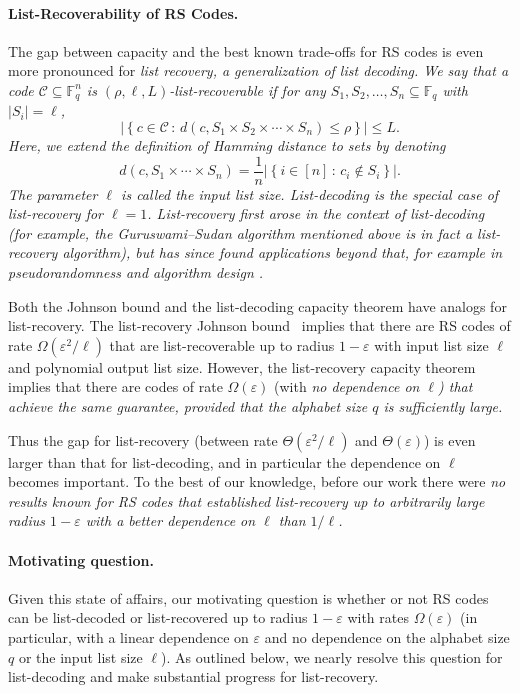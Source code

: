 \documentclass[11pt]{article}
\renewcommand{\epsilon}{\varepsilon}
\newcommand{\eps}{\epsilon}
\newcommand{\F}{{\mathbb{F}}}
\newcommand{\cC}{\mathcal{C}}
\newcommand{\mkw}[1]{{\color{orange}{\small [Mary: #1]}}}
\begin{document}

\paragraph{List-Recoverability of RS Codes.}
The gap between capacity and the best known trade-offs for RS codes is even more pronounced for \em list recovery, \em a generalization of list decoding.
We say that a code $\cC \subseteq \F_q^n$ is $(\rho, \ell, L)$-list-recoverable if for any $S_1, S_2, \ldots, S_n \subseteq \F_q$ with $|S_i| = \ell$,
\[ |\left\{ c \in \cC \,:\, d(c, S_1 \times S_2 \times \cdots \times S_n) \leq \rho  \right\} | \leq L. \]
Here, we extend the definition of Hamming distance to sets by denoting
\[ d(c, S_1 \times\cdots \times S_n) = \frac{1}{n} |\left\{ i \in [n] \,:\, c_i \not\in S_i \right\}|.\]
The parameter $\ell$ is called the \em input list size. \em
List-decoding is the special case of list-recovery for $\ell=1$.  List-recovery first arose in the context of list-decoding (for example, the Guruswami--Sudan algorithm mentioned above is in fact a list-recovery algorithm), but has since found applications beyond that, for example in pseudorandomness \cite{GUV09} and algorithm design \cite{doron2020high}.

Both the Johnson bound and the list-decoding capacity theorem have analogs for list-recovery.  The list-recovery Johnson bound~\cite{GS01} implies that there are RS codes of rate $\Omega(\eps^2/\ell)$ that are list-recoverable up to radius $1 - \eps$ with input list size $\ell$ and polynomial output list size.
However, the list-recovery capacity theorem implies that there are codes of rate $\Omega(\eps)$ (with \em no \em dependence on $\ell$) that achieve the same guarantee, provided that the alphabet size $q$ is sufficiently large.

Thus the gap for list-recovery (between rate $\Theta(\eps^2/\ell)$ and $\Theta(\eps)$) is even larger than that for list-decoding, and in particular the dependence on $\ell$ becomes important.  To the best of our knowledge, before our work there were \em no \em results known for RS codes that established list-recovery up to arbitrarily large radius $1 - \eps$ with a better dependence on $\ell$ than $1/\ell$.

\paragraph{Motivating question.}
Given this state of affairs, our motivating question is whether or not RS codes can be list-decoded or list-recovered up to radius $1 - \eps$ with rates $\Omega(\eps)$ (in particular, with a linear dependence on $\eps$ and no dependence on the alphabet size $q$ or the input list size $\ell$).  As outlined below, we nearly resolve this question for list-decoding and make substantial progress for list-recovery.
\end{document}
